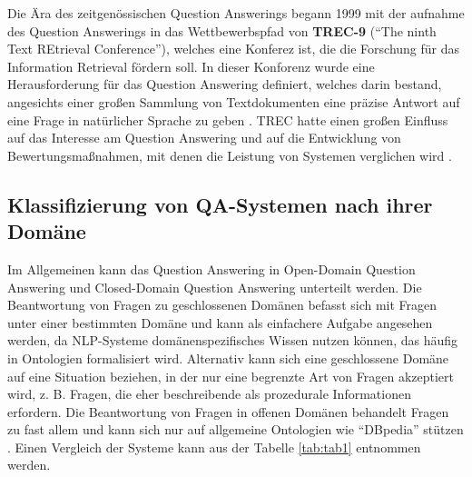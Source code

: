 \documentclass[
        ngerman,
        paper=a4,
        numbers=noendperiod,
]{scrreprt}
\begin{document}
Die Ära des zeitgenössischen Question Answerings begann 1999 mit der aufnahme des Question Answerings in das Wettbewerbspfad von \textbf{TREC-9} (\enquote{The ninth Text REtrieval Conference}), welches eine  Konferez ist, die die Forschung für das Information Retrieval fördern soll. In dieser Konforenz wurde eine Herausforderung für das Question Answering definiert, welches darin bestand, angesichts einer großen Sammlung von Textdokumenten eine präzise Antwort auf eine Frage in natürlicher Sprache zu geben \citep{VoorheesReportTREC-9}. TREC hatte einen großen Einfluss auf das Interesse am Question Answering und auf die Entwicklung von Bewertungsmaßnahmen, mit denen die Leistung von Systemen verglichen wird \citep{voorhees2005trec}. 



\subsection{Klassifizierung von QA-Systemen nach ihrer Domäne}
Im Allgemeinen kann das Question Answering in Open-Domain Question Answering und Closed-Domain Question Answering unterteilt werden. Die Beantwortung von Fragen zu geschlossenen Domänen befasst sich mit Fragen unter einer bestimmten Domäne und kann als einfachere Aufgabe angesehen werden, da NLP-Systeme domänenspezifisches Wissen nutzen können, das häufig in Ontologien formalisiert wird. Alternativ kann sich eine geschlossene Domäne auf eine Situation beziehen, in der nur eine begrenzte Art von Fragen akzeptiert wird, z. B. Fragen, die eher beschreibende als prozedurale Informationen erfordern. Die Beantwortung von Fragen in offenen Domänen behandelt Fragen zu fast allem und kann sich nur auf allgemeine Ontologien wie \enquote{DBpedia} stützen \citep{Mervin2013AnSystem}. Einen Vergleich der Systeme kann aus der Tabelle \ref{tab:tab1} entnommen werden.
\end{document}
